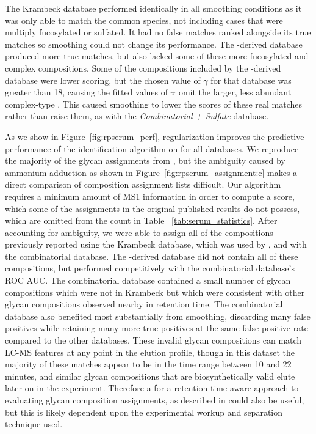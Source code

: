     The Krambeck database performed identically in all smoothing conditions as it
    was only able to match the common species, not including cases that were multiply
    fucosylated or sulfated. It had no false matches ranked alongside its true matches so
    smoothing could not change its performance. The \glyspace-derived database produced more true
    matches, but also lacked some of these more fucosylated and complex compositions. Some of the
    compositions included by the \glyspace-derived database were lower scoring, but the chosen
    value of $\gamma$ for that database was greater than 18, causing the fitted values of $\mathbf{\tau}$
    omit the larger, less abundant complex-type \nglycans. This caused smoothing to lower the scores
    of these real matches rather than raise them, as with the \textit{Combinatorial + Sulfate} database.

    As we show in Figure~\ref{fig:rpserum_perf}, regularization improves the
    predictive performance of the identification algorithm on \rpserum for all databases.
    We reproduce the majority of the glycan assignments from \cite{Yu2013}, but the ambiguity
    caused by ammonium adduction as shown in Figure~\ref{fig:rpserum_assignment:c} makes a
    direct comparison of composition assignment lists difficult. Our algorithm requires a minimum
    amount of MS1 information in order to compute a score, which some of the assignments in the
    original published results do not possess, which are omitted from the count in Table~
    \ref{tab:serum_statistics}. After accounting for ambiguity, we were able to assign all
    of the compositions previously reported using the Krambeck database, which was used
    by \cite{Yu2013}, and with the combinatorial database. The \glyspace-derived database did not
    contain all of these compositions, but performed competitively with the combinatorial
    database's ROC AUC. The combinatorial database contained a small number of glycan compositions
    which were not in Krambeck but which were consistent with other glycan compositions
    observed nearby in retention time. The combinatorial database also benefited most
    substantially from smoothing, discarding many false positives while retaining many more
    true positives at the same false positive rate compared to the other databases. These
    invalid glycan compositions can match LC-MS features at any point in the elution profile,
    though in this dataset the majority of these matches appear to be in the time range between
    10 and 22 minutes, and similar glycan compositions that are biosynthetically valid elute
    later on in the experiment. Therefore a for a retention-time aware approach to evaluating glycan
    composition assignments, as described in \cite{Hu2016} could also be useful, but this is
    likely dependent upon the experimental workup and separation technique used.

